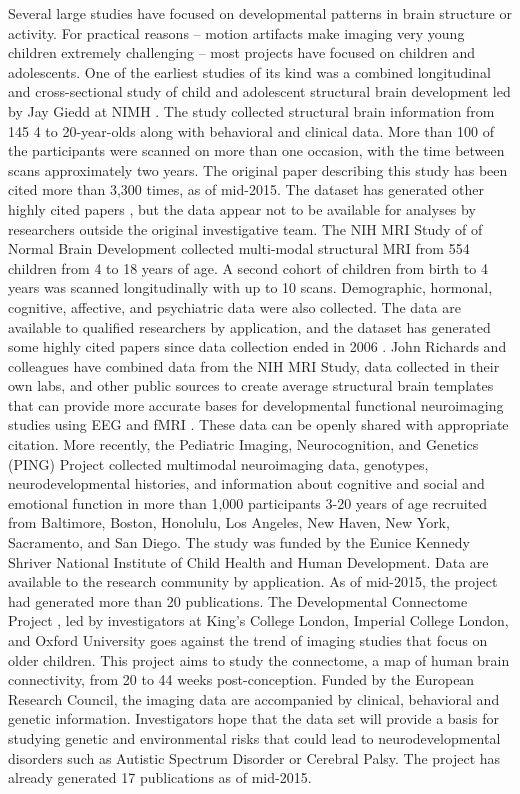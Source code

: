 \documentclass[letterpaper,man,apacite]{apa6}
\begin{document}
Several large studies have focused on developmental patterns in brain structure or activity.
For practical reasons -- motion artifacts make imaging very young children extremely challenging -- most projects have focused on children and adolescents.
One of the earliest studies of its kind was a combined longitudinal and cross-sectional study of child and adolescent structural brain development led by Jay Giedd at NIMH \cite{giedd_brain_1999}.
The study collected structural brain information from 145 4 to 20-year-olds along with behavioral and clinical data.
More than 100 of the participants were scanned on more than one occasion, with the time between scans approximately two years.
The original paper describing this study has been cited more than 3,300 times, as of mid-2015.
The dataset has generated other highly cited papers \cite{gogtay_dynamic_2004}, but the data appear not to be available for analyses by researchers outside the original investigative team.
The NIH MRI Study of of Normal Brain Development \cite{NIH_Pediatric_MRI} collected multi-modal structural MRI from 554 children from 4 to 18 years of age.
A second cohort of children from birth to 4 years was scanned longitudinally with up to 10 scans. 
Demographic, hormonal, cognitive, affective, and psychiatric data were also collected.
The data are available to qualified researchers by application, and the dataset has generated some highly cited papers since data collection ended in 2006 \cite{group_total_2012, zielinski_network-level_2010}.
John Richards and colleagues have combined data from the NIH MRI Study, data collected in their own labs, and other public sources to create average structural brain templates that can provide more accurate bases for developmental functional neuroimaging studies using EEG and fMRI \cite{Richards_Developmental_MRI_Database, richards_database_2015}.
These data can be openly shared with appropriate citation.
More recently, the Pediatric Imaging, Neurocognition, and Genetics (PING) Project \cite{PING} collected multimodal neuroimaging data, genotypes, neurodevelopmental histories, and information about cognitive and social and emotional function in more than 1,000 participants 3-20 years of age recruited from Baltimore, Boston, Honolulu, Los Angeles, New Haven, New York, Sacramento, and San Diego. 
The study was funded by the Eunice Kennedy Shriver National Institute of Child Health and Human Development.
Data are available to the research community by application.
As of mid-2015, the project had generated more than 20 publications.
The Developmental Connectome Project \cite{developmental_connectome}, led by investigators at King’s College London, Imperial College London, and Oxford University goes against the trend of imaging studies that focus on older children.
This project aims to study the connectome, a map of human brain connectivity, from 20 to 44 weeks post-conception.
Funded by the European Research Council, the imaging data are accompanied by clinical, behavioral and genetic information.
Investigators hope that the data set will provide a basis for studying genetic and environmental risks that could lead to neurodevelopmental disorders such as Autistic Spectrum Disorder or Cerebral Palsy.
The project has already generated 17 publications as of mid-2015.
\end{document}
